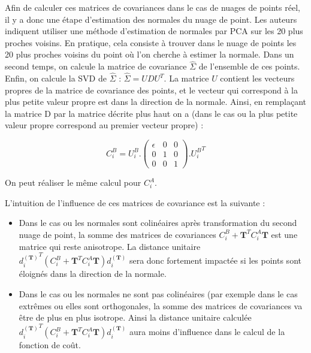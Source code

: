 Afin de calculer ces matrices de covariances dans le cas de nuages de points réel, il y a donc une étape d'estimation des normales du nuage de point. Les auteurs indiquent utiliser une méthode d'estimation de normales par PCA sur les 20 plus proches voisins. En pratique, cela consiste à trouver dans le nuage de points les 20 plus proches voisins du point où l'on cherche à estimer la normale. Dans un second temps, on calcule la matrice de covariance $\hat{\Sigma}$ de l'ensemble de ces points. Enfin, on calcule la SVD de $\hat{\Sigma}$ : $\hat{\Sigma} = UDU^{T}$. La matrice $U$ contient les vecteurs propres de la matrice de covariance des points, et le vecteur qui correspond à la plus petite valeur propre est dans la direction de la normale. Ainsi, en remplaçant la matrice D par la matrice décrite plus haut on a (dans le cas ou la plus petite valeur propre correspond au premier vecteur propre) :

\begin{equation}
C_{i}^B = U_{i}^B.\begin{pmatrix} 
 \epsilon & 0 & 0 \\
 0 & 1 & 0 \\ 
 0 & 0 & 1 
 \end{pmatrix}.{U_{i}^{B}}^T
\end{equation}

On peut réaliser le même calcul pour $C_{i}^A$.

L'intuition de l'influence de ces matrices de covariance est la suivante :\\

\begin{itemize}
\item{Dans le cas ou les normales sont colinéaires après transformation du second nuage de point, la somme des matrices de covariances $C_{i}^B + \mathbf{T}^{T}C_{i}^{A}\mathbf{T}$ est une matrice qui reste anisotrope. La distance unitaire ${d_{i}^{(\mathbf{T})}}^{T}(C_{i}^B + \mathbf{T}^{T}C_{i}^{A}\mathbf{T})d_{i}^{(\mathbf{T})}$ sera donc fortement impactée si les points sont éloignés dans la direction de la normale.  
}

\item{Dans le cas ou les normales ne sont pas colinéaires (par exemple dans le cas extrêmes ou elles sont orthogonales}, la somme des matrices de covariances va être de plus en plus isotrope. Ainsi la distance unitaire calculée ${d_{i}^{(\mathbf{T})}}^{T}(C_{i}^B + \mathbf{T}^{T}C_{i}^{A}\mathbf{T})d_{i}^{(\mathbf{T})}$ aura moins d'influence dans le calcul de la fonction de coût.
\end{itemize}

